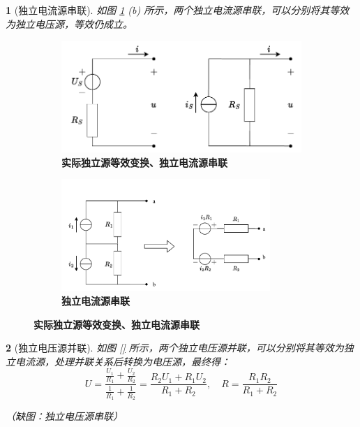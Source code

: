 \documentclass[UTF8]{report}
\theoremstyle{MyLineTheoremStyle} %
\theoremstyle{MyBlockTheoremStyle} %
\theoremstyle{MySubsubsectionStyle} %
\newtheorem{definition}{}
\begin{document}
\begin{definition}[独立电流源串联]
如图 \ref{实际独立源等效变换、独立电流源串联} (b) 所示，两个独立电流源串联，可以分别将其等效为独立电压源，等效仍成立。
\end{definition}

\begin{figure}[H]\centering
\begin{subfigure}[t]{0.53\textwidth}\centering
    \includegraphics[height=120pt]{assets/1,2/独立源等效.drawio.pdf}
    \caption{\bfseries 实际独立源等效变换、独立电流源串联 }
\end{subfigure}\begin{subfigure}[t]{0.47\textwidth}\centering
    \includegraphics[height=120pt]{assets/1,2/独立电流源并联.drawio.pdf}
    \caption{\bfseries 独立电流源串联 }
\end{subfigure}
\caption{\bfseries 实际独立源等效变换、独立电流源串联 }\label{实际独立源等效变换、独立电流源串联}
\end{figure}


\begin{definition}[独立电压源并联]
如图 \ref{} 所示，两个独立电压源并联，可以分别将其等效为独立电流源，处理并联关系后转换为电压源，最终得：
\begin{equation}
U = \frac{\frac{U_1}{R_1} + \frac{U_2}{R_2}}{\frac{1}{R_1} + \frac{1}{R_2}} = \frac{R_2U_1 + R_1U_2}{R_1+R_2}, \quad R = \frac{R_1R_2}{R_1 + R_2}
\end{equation}

{\color{red} （缺图：独立电压源串联）}

\end{definition}
\end{document}
